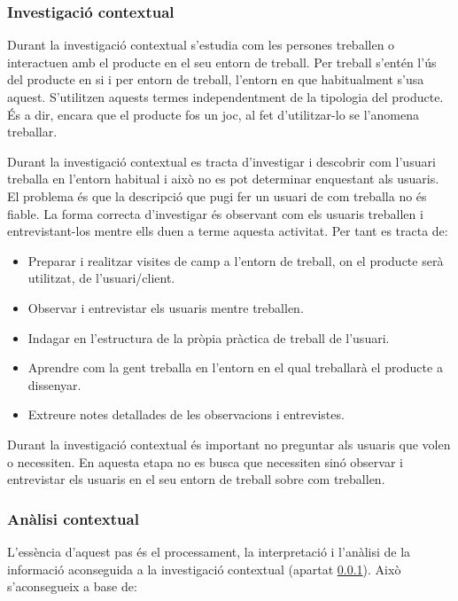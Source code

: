 \subsubsection{Investigació contextual}\label{subsec:investigacio_contextual}
Durant la investigació contextual s'estudia com les persones treballen o interactuen amb el producte en el seu entorn de treball. Per treball s'entén l'ús del producte en si i per entorn de treball, l'entorn en que habitualment s'usa aquest. S'utilitzen aquests termes independentment de la tipologia del producte. És a dir, encara que el producte fos un joc, al fet d'utilitzar-lo se l'anomena treballar. 

Durant la investigació contextual es tracta d'investigar i descobrir com l'usuari treballa en l'entorn habitual i això no es pot determinar enquestant als usuaris. El problema és que la descripció que pugi fer un usuari de com treballa no és fiable. La forma correcta d'investigar és observant com els usuaris treballen i entrevistant-los mentre ells duen a terme aquesta activitat. Per tant es tracta de:

\begin{itemize}
\item Preparar i realitzar visites de camp a l'entorn de treball, on el producte serà utilitzat, de l'usuari/client.
\item Observar i entrevistar els usuaris mentre treballen.
\item Indagar en l'estructura de la pròpia pràctica de treball de l'usuari.
\item Aprendre com la gent treballa en l'entorn en el qual treballarà el producte a dissenyar.
\item Extreure notes detallades de les observacions i entrevistes.
\end{itemize}

Durant la investigació contextual és important no preguntar als usuaris que volen o necessiten. En aquesta etapa no es busca que necessiten sinó observar i entrevistar els usuaris en el seu entorn de treball sobre com treballen.


\subsubsection{Anàlisi contextual}\label{subsec:analisi_contextual}
L'essència d'aquest pas és el processament, la interpretació i l'anàlisi de la informació aconseguida a la investigació contextual (apartat \ref{subsec:investigacio_contextual}). Això s'aconsegueix a base de:

